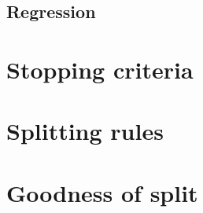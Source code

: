 
\subsection{Regression}



\section{Stopping criteria}
\label{sec:3:stop}



\section{Splitting rules}
\label{sec:3:splitting-rules}


\section{Goodness of split}
\label{sec:3:criteria}


